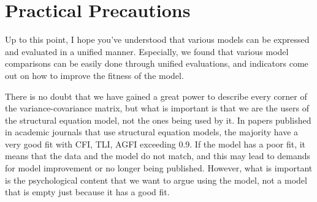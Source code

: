 \documentclass{ltjsbook}
\begin{document}
\section{Practical Precautions}
Up to this point, I hope you've understood that various models can be expressed and evaluated in a unified manner.
Especially, we found that various model comparisons can be easily done through unified evaluations, and indicators come out on how to improve the fitness of the model.

There is no doubt that we have gained a great power to describe every corner of the variance-covariance matrix, but what is important is that we are the users of the structural equation model, not the ones being used by it. In papers published in academic journals that use structural equation models, the majority have a very good fit with CFI, TLI, AGFI exceeding 0.9. If the model has a poor fit, it means that the data and the model do not match, and this may lead to demands for model improvement or no longer being published. However, what is important is the psychological content that we want to argue using the model, not a model that is empty just because it has a good fit.
\end{document}

